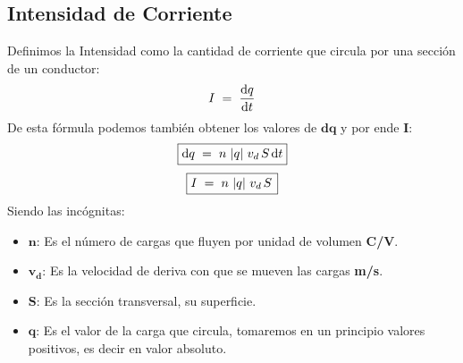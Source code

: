 
\subsection{Intensidad de Corriente}
\begin{wrapfigure}{r}{3cm}
\end{wrapfigure}
 Definimos la Intensidad como la cantidad de corriente que circula por una sección de un conductor:
\[
        I \hspace{1mm}= \hspace{1mm} \frac{\mathrm{d}q }{\mathrm{d} t}
\]
 De esta fórmula podemos también obtener los valores de \(\mathbf{d}\bm{q}\) y por ende \textbf{I}:
\[
        \boxed{\mathrm{d}q \hspace{1mm}= \hspace{1mm} n\hspace{.5mm}\left | q\right |\hspace{.5mm}v_d\hspace{.5mm}S\hspace{.5mm}\mathrm{d}t}
\]
\[
        \boxed{I \hspace{1mm}= \hspace{1mm} n\hspace{.5mm}\left | q\right |\hspace{.5mm}v_d\hspace{.5mm}S\hspace{.5mm}}
\]
Siendo las incógnitas:
\begin{itemize}
        \item \(\bm{n}\): Es el número de cargas que fluyen por unidad de volumen \textbf{C/V}.
        \item \(\bm{v_d}\): Es la velocidad de deriva con que se mueven las cargas \textbf{m/s}.
        \item \(\bm{S}\): Es la sección transversal, su superficie.
        \item \(\bm{q}\): Es el valor de la carga que circula, tomaremos en un principio valores positivos, es decir en valor absoluto.
\end{itemize}

